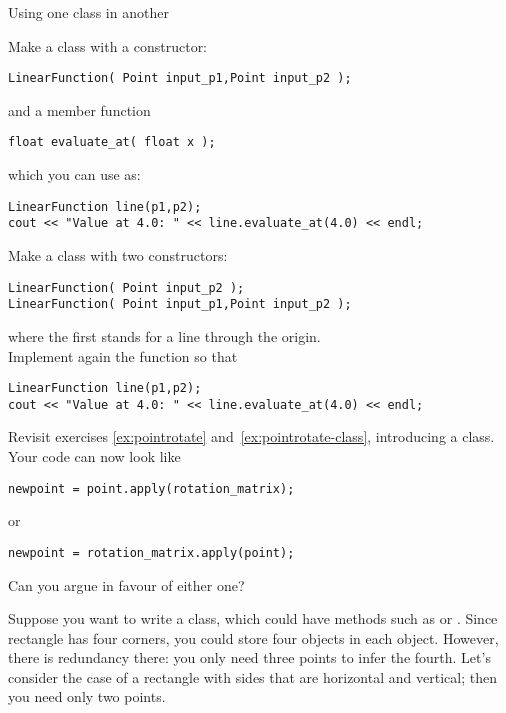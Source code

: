  {Using one class in another}
\label{sec:FuncHasPoint}
\label{sec:poly-rectangle}

\prerequisite{\ref{sec:hasa}}

\begin{exercise}
  \label{ex:geom:line}
  Make a class  with a constructor:
\begin{lstlisting}
LinearFunction( Point input_p1,Point input_p2 );
\end{lstlisting}
  and a member function
\begin{lstlisting}
float evaluate_at( float x );
\end{lstlisting}
  which you can use as:
\begin{lstlisting}
LinearFunction line(p1,p2);
cout << "Value at 4.0: " << line.evaluate_at(4.0) << endl;
\end{lstlisting}
\end{exercise}

\begin{exercise}
  \label{ex:geom:line2}
  Make a class  with two constructors:
\begin{lstlisting}
LinearFunction( Point input_p2 );
LinearFunction( Point input_p1,Point input_p2 );
\end{lstlisting}
where the first stands for a line through the origin.\\
Implement again the  function so that
\begin{lstlisting}
LinearFunction line(p1,p2);
cout << "Value at 4.0: " << line.evaluate_at(4.0) << endl;
\end{lstlisting}
\end{exercise}

\begin{exercise}
  \label{ex:pointrotate-matrix}
  Revisit exercises \ref{ex:pointrotate}
  and~\ref{ex:pointrotate-class}, introducing a  class. Your
  code can now look like
\begin{lstlisting}
newpoint = point.apply(rotation_matrix);
\end{lstlisting}
  or
\begin{lstlisting}
newpoint = rotation_matrix.apply(point);
\end{lstlisting}
  Can you argue in favour of either one?
\end{exercise}

Suppose you want to write a  class, which could have methods such as
 or .
Since rectangle has four corners, you could store four 
objects in each  object. However, there is redundancy
there: you only need three points to infer the fourth. Let's consider
the case of a rectangle with sides that are horizontal and vertical;
then you need only two points.

